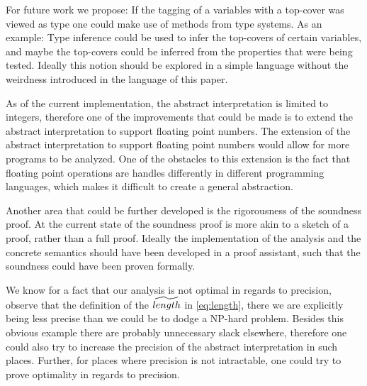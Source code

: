 For future work we propose:
If the tagging of a variables with a top-cover was viewed as type one could make use of methods from type systems.
As an example: Type inference could be used to infer the top-covers of certain variables, and maybe the top-covers could be inferred from the properties that were being tested.
Ideally this notion should be explored in a simple language without the weirdness introduced in the language of this paper.

As of the current implementation, the abstract interpretation is limited to integers, therefore one of the improvements that could be made is to extend the abstract interpretation to support floating point numbers.
The extension of the abstract interpretation to support floating point numbers would allow for more programs to be analyzed.
One of the obstacles to this extension is the fact that floating point operations are handles differently in different programming languages, which makes it difficult to create a general abstraction.

Another area that could be further developed is the rigorousness of the soundness proof.
At the current state of the soundness proof is more akin to a sketch of a proof, rather than a full proof.
Ideally the implementation of the analysis and the concrete semantics should have been developed in a proof assistant, such that the soundness could have been proven formally.

We know for a fact that our analysis is not optimal in regards to precision, observe that the definition of the $\widetilde{length}$ in \autoref{eq:length}, there we are explicitly being less precise than we could be to dodge a NP-hard problem.
Besides this obvious example there are probably unnecessary slack elsewhere, therefore one could also try to increase the precision of the abstract interpretation in such places.
Further, for places where precision is not intractable, one could try to prove optimality in regards to precision.

